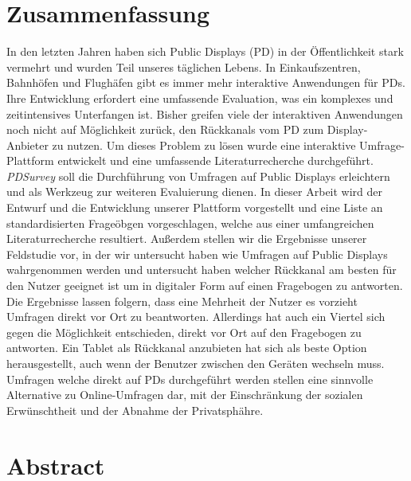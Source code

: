 
\section*{Zusammenfassung}

	In den letzten Jahren haben sich Public Displays (PD) in der {\"O}ffentlichkeit stark vermehrt und wurden Teil unseres t{\"a}glichen Lebens. In Einkaufszentren, Bahnh{\"o}fen und Flugh{\"a}fen gibt es immer mehr interaktive Anwendungen f{\"u}r PDs. Ihre Entwicklung erfordert eine umfassende Evaluation, was ein komplexes und zeitintensives Unterfangen ist. Bisher greifen viele der interaktiven Anwendungen noch nicht auf M{\"o}glichkeit zur{\"u}ck, den R{\"u}ckkanals vom PD zum Display-Anbieter zu nutzen. Um dieses Problem zu l{\"o}sen wurde eine interaktive Umfrage-Plattform entwickelt und eine umfassende Literaturrecherche durchgef{\"u}hrt. \textit{PDSurvey} soll die Durchf{\"u}hrung von Umfragen auf Public Displays erleichtern und als Werkzeug zur weiteren Evaluierung dienen. In dieser Arbeit wird der Entwurf und die Entwicklung unserer Plattform vorgestellt und eine Liste an standardisierten Frage{\"o}bgen vorgeschlagen, welche aus einer umfangreichen Literaturrecherche resultiert. Au{\ss}erdem stellen wir die Ergebnisse unserer Feldstudie vor, in der wir untersucht haben wie Umfragen auf Public Displays wahrgenommen werden und untersucht haben welcher R{\"u}ckkanal am besten f{\"u}r den Nutzer geeignet ist um in digitaler Form auf einen Fragebogen zu antworten.
	Die Ergebnisse lassen folgern, dass eine Mehrheit der Nutzer es vorzieht Umfragen direkt vor Ort zu beantworten. Allerdings hat auch ein Viertel sich gegen die M{\"o}glichkeit entschieden, direkt vor Ort auf den Fragebogen zu antworten. Ein Tablet als R{\"u}ckkanal anzubieten hat sich als beste Option herausgestellt, auch wenn der Benutzer zwischen den Ger{\"a}ten wechseln muss. Umfragen welche direkt auf PDs durchgef{\"u}hrt werden stellen eine sinnvolle Alternative zu Online-Umfragen dar, mit der Einschr{\"a}nkung der sozialen Erw{\"u}nschtheit und der Abnahme der Privatsph{\"a}hre.


\section*{Abstract}

